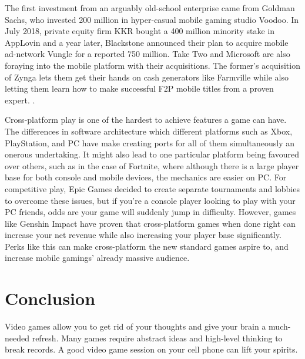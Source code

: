 \documentclass[sig-alternate]{article}
\begin{document}
\begin{multicols}{1}
The first investment from an arguably old-school enterprise came from Goldman Sachs, who invested 200 million in hyper-casual mobile gaming studio Voodoo. In July 2018, private equity firm KKR bought a 400 million minority stake in AppLovin and a year later, Blackstone announced their plan to acquire mobile ad-network Vungle for a reported 750 million. Take Two and Microsoft are also foraying into the mobile platform with their acquisitions. The former’s acquisition of Zynga lets them get their hands on cash generators like Farmville while also letting them learn how to make successful F2P mobile titles from a proven expert. \cite{Good}. 

Cross-platform play is one of the hardest to achieve features a game can have. The differences in software architecture which different platforms such as Xbox, PlayStation, and PC have make creating ports for all of them simultaneously an onerous undertaking. It might also lead to one particular platform being favoured over others, such as in the case of Fortnite, where although there is a large player base for both console and mobile devices, the mechanics are easier on PC. For competitive play, Epic Games decided to create separate tournaments and lobbies to overcome these issues, but if you’re a console player looking to play with your PC friends, odds are your game will suddenly jump in difficulty. However, games like Genshin Impact have proven that cross-platform games when done right can increase your net revenue while also increasing your player base significantly. Perks like this can make cross-platform the new standard games aspire to, and increase mobile gamings’ already massive audience. 


\section{Conclusion}
Video games allow you to get rid of your thoughts and give your brain a much-needed refresh. Many games require abstract ideas and high-level thinking to break records. A good video game session on your cell phone can lift your spirits.  

                                   

               

\end{multicols}				
\end{document}
